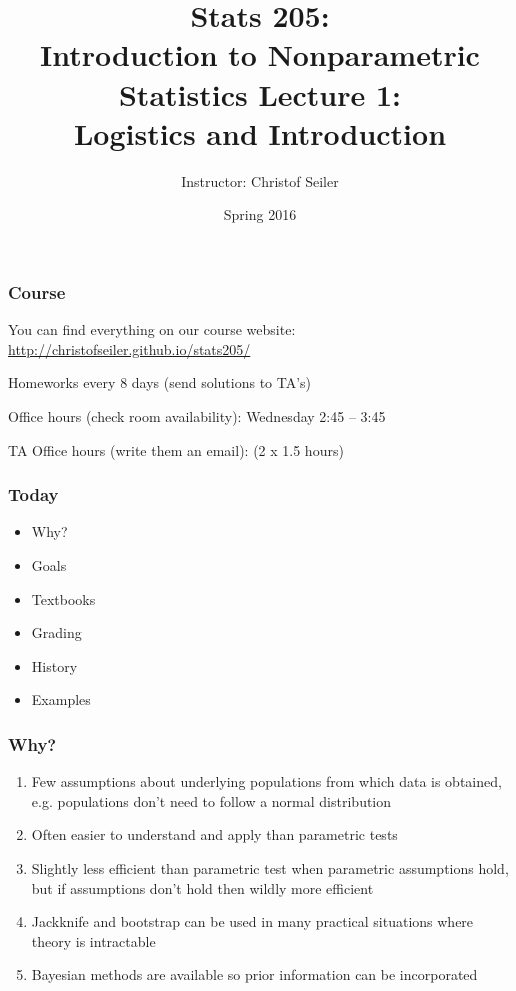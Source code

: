 \documentclass[10pt]{beamer}
\title{\large \bfseries Stats 205: \\ Introduction to Nonparametric Statistics \linebreak \linebreak \linebreak
Lecture 1: \\ Logistics and Introduction}
\author{Instructor: Christof Seiler}
\date{Spring 2016}
\begin{document}
\frame{
\thispagestyle{empty}
\titlepage
}

\begin{frame}
\frametitle{Course}

You can find everything on our course website:
\url{http://christofseiler.github.io/stats205/} \newline

Homeworks every 8 days (send solutions to TA's) \newline

Office hours (\alert{check room availability}): \newline
Wednesday 2:45 -- 3:45 \newline

TA Office hours (\alert{write them an email}): \newline 
(2 x 1.5 hours) 

\end{frame}

\begin{frame}
\frametitle{Today}

\begin{itemize}
\item Why?
\item Goals
\item Textbooks
\item Grading
\item History
\item Examples
\end{itemize}

\end{frame}

\begin{frame}
\frametitle{Why?}

\begin{enumerate}
\item Few assumptions about underlying populations from which data is obtained, e.g. populations don't need to follow a normal distribution
\item Often easier to understand and apply than parametric tests
\item Slightly less efficient than parametric test when parametric assumptions hold, but if assumptions don't hold then wildly more efficient
\item Jackknife and bootstrap can be used in many practical situations where theory is intractable
\item Bayesian methods are available so prior information can be incorporated
\end{enumerate}

\end{frame}
\end{document}
